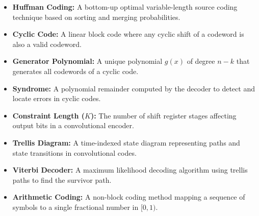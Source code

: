 \documentclass[12pt,a4paper]{article}
\begin{document}
\begin{tcolorbox}[defbox, title={\textbf{One-Line Definitions}}]
\begin{itemize}[leftmargin=*, itemsep=2.5pt, topsep=0pt]
  \item \textbf{Huffman Coding:} A bottom-up optimal variable-length source coding technique based on sorting and merging probabilities.
  \item \textbf{Cyclic Code:} A linear block code where any cyclic shift of a codeword is also a valid codeword.
  \item \textbf{Generator Polynomial:} A unique polynomial $g(x)$ of degree $n-k$ that generates all codewords of a cyclic code.
  \item \textbf{Syndrome:} A polynomial remainder computed by the decoder to detect and locate errors in cyclic codes.
  \item \textbf{Constraint Length ($K$):} The number of shift register stages affecting output bits in a convolutional encoder.
  \item \textbf{Trellis Diagram:} A time-indexed state diagram representing paths and state transitions in convolutional codes.
  \item \textbf{Viterbi Decoder:} A maximum likelihood decoding algorithm using trellis paths to find the survivor path.
  \item \textbf{Arithmetic Coding:} A non-block coding method mapping a sequence of symbols to a single fractional number in $[0, 1)$.
\end{itemize}
\end{tcolorbox}
\end{document}
